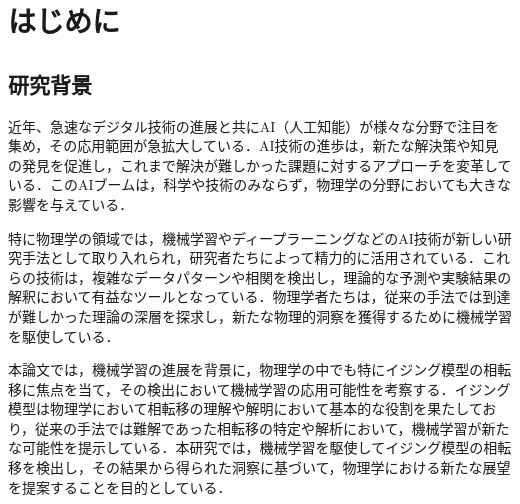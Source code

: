 \documentclass[a4paper,11pt]{jsreport}
\begin{document}
\thispagestyle{empty}
\clearpage


\tableofcontents

\pagestyle{fancy}
\lhead{\rightmark}
\renewcommand{\chaptermark}[1]{\markboth{第\ \normalfont\thechapter\ 章~~#1}{}}
\chapter{はじめに} %
\section{研究背景}
近年、急速なデジタル技術の進展と共にAI（人工知能）が様々な分野で注目を集め，その応用範囲が急拡大している．AI技術の進歩は，新たな解決策や知見の発見を促進し，これまで解決が難しかった課題に対するアプローチを変革している．このAIブームは，科学や技術のみならず，物理学の分野においても大きな影響を与えている．\par
特に物理学の領域では，機械学習やディープラーニングなどのAI技術が新しい研究手法として取り入れられ，研究者たちによって精力的に活用されている．これらの技術は，複雑なデータパターンや相関を検出し，理論的な予測や実験結果の解釈において有益なツールとなっている．物理学者たちは，従来の手法では到達が難しかった理論の深層を探求し，新たな物理的洞察を獲得するために機械学習を駆使している．\par
本論文では，機械学習の進展を背景に，物理学の中でも特にイジング模型の相転移に焦点を当て，その検出において機械学習の応用可能性を考察する．イジング模型は物理学において相転移の理解や解明において基本的な役割を果たしており，従来の手法では難解であった相転移の特定や解析において，機械学習が新たな可能性を提示している．本研究では，機械学習を駆使してイジング模型の相転移を検出し，その結果から得られた洞察に基づいて，物理学における新たな展望を提案することを目的としている．
\end{document}
